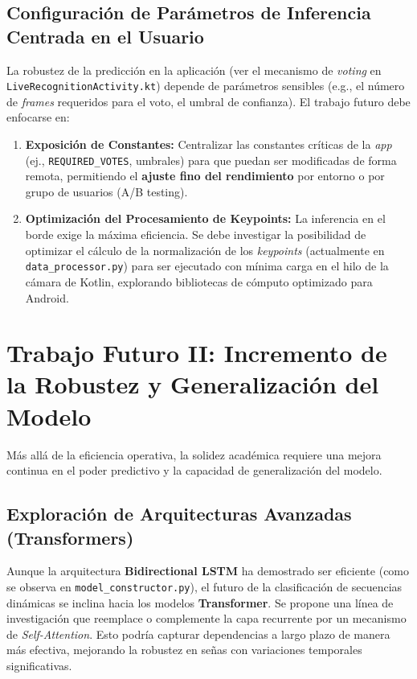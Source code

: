 \subsection{Configuración de Parámetros de Inferencia Centrada en el Usuario}
\par La robustez de la predicción en la aplicación (ver el mecanismo de \textit{voting} en \lstinline|LiveRecognitionActivity.kt|) depende de parámetros sensibles (e.g., el número de \textit{frames} requeridos para el voto, el umbral de confianza). El trabajo futuro debe enfocarse en:
\begin{enumerate}
    \item \textbf{Exposición de Constantes:} Centralizar las constantes críticas de la \textit{app} (ej., \lstinline|REQUIRED_VOTES|, umbrales) para que puedan ser modificadas de forma remota, permitiendo el \textbf{ajuste fino del rendimiento} por entorno o por grupo de usuarios (A/B testing).
    \item \textbf{Optimización del Procesamiento de Keypoints:} La inferencia en el borde exige la máxima eficiencia. Se debe investigar la posibilidad de optimizar el cálculo de la normalización de los \textit{keypoints} (actualmente en \lstinline|data_processor.py|) para ser ejecutado con mínima carga en el hilo de la cámara de Kotlin, explorando bibliotecas de cómputo optimizado para Android.
\end{enumerate}

\section{Trabajo Futuro II: Incremento de la Robustez y Generalización del Modelo}
\label{sec:robustez_modelo}

\par Más allá de la eficiencia operativa, la solidez académica requiere una mejora continua en el poder predictivo y la capacidad de generalización del modelo.

\subsection{Exploración de Arquitecturas Avanzadas (Transformers)}
\par Aunque la arquitectura \textbf{Bidirectional LSTM} ha demostrado ser eficiente (como se observa en \lstinline|model_constructor.py|), el futuro de la clasificación de secuencias dinámicas se inclina hacia los modelos \textbf{Transformer}. Se propone una línea de investigación que reemplace o complemente la capa recurrente por un mecanismo de \textit{Self-Attention}. Esto podría capturar dependencias a largo plazo de manera más efectiva, mejorando la robustez en señas con variaciones temporales significativas.

